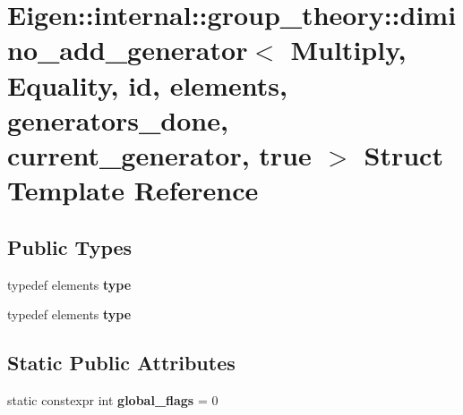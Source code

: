 \hypertarget{struct_eigen_1_1internal_1_1group__theory_1_1dimino__add__generator_3_01_multiply_00_01_equality1109fbb0e963fbe870ce5c0363b21d03}{}\section{Eigen\+:\+:internal\+:\+:group\+\_\+theory\+:\+:dimino\+\_\+add\+\_\+generator$<$ Multiply, Equality, id, elements, generators\+\_\+done, current\+\_\+generator, true $>$ Struct Template Reference}
\label{struct_eigen_1_1internal_1_1group__theory_1_1dimino__add__generator_3_01_multiply_00_01_equality1109fbb0e963fbe870ce5c0363b21d03}
\subsection*{Public Types}
\begin{DoxyCompactItemize}
\item 
\mbox{\label{struct_eigen_1_1internal_1_1group__theory_1_1dimino__add__generator_3_01_multiply_00_01_equality1109fbb0e963fbe870ce5c0363b21d03_a297ee7bee83e99dcb6c76c711e190b94}} 
typedef elements {\bfseries type}
\item 
\mbox{\label{struct_eigen_1_1internal_1_1group__theory_1_1dimino__add__generator_3_01_multiply_00_01_equality1109fbb0e963fbe870ce5c0363b21d03_a297ee7bee83e99dcb6c76c711e190b94}} 
typedef elements {\bfseries type}
\end{DoxyCompactItemize}
\subsection*{Static Public Attributes}
\begin{DoxyCompactItemize}
\item 
\mbox{\label{struct_eigen_1_1internal_1_1group__theory_1_1dimino__add__generator_3_01_multiply_00_01_equality1109fbb0e963fbe870ce5c0363b21d03_a9ae7ff00b61ce7534f15a3cf3dc44b04}} 
static constexpr int {\bfseries global\+\_\+flags} = 0
\end{DoxyCompactItemize}


